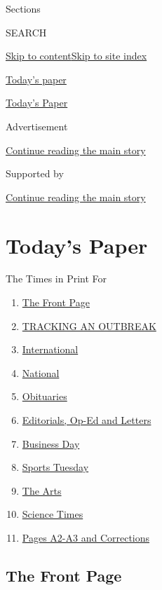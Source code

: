 Sections

SEARCH

\protect\hyperlink{site-content}{Skip to
content}\protect\hyperlink{site-index}{Skip to site index}

\href{https://www.nytimes.com/section/todayspaper}{Today's paper}

\href{https://myaccount.nytimes.com/auth/login?response_type=cookie\&client_id=vi}{}

\href{https://www.nytimes.com/section/todayspaper}{Today's Paper}

Advertisement

\protect\hyperlink{after-top}{Continue reading the main story}

Supported by

\protect\hyperlink{after-sponsor}{Continue reading the main story}

\hypertarget{todays-paper}{%
\section{Today's Paper}\label{todays-paper}}

The Times in Print For

\begin{enumerate}
\def\labelenumi{\arabic{enumi}.}
\tightlist
\item
  \protect\hyperlink{thefrontpage}{The Front Page}
\item
  \protect\hyperlink{trackinganoutbreak}{TRACKING AN OUTBREAK}
\item
  \protect\hyperlink{international}{International}
\item
  \protect\hyperlink{national}{National}
\item
  \protect\hyperlink{obituaries}{Obituaries}
\item
  \protect\hyperlink{editorialsux2cop-edandletters}{Editorials, Op-Ed
  and Letters}
\item
  \protect\hyperlink{businessday}{Business Day}
\item
  \protect\hyperlink{sportstuesday}{Sports Tuesday}
\item
  \protect\hyperlink{thearts}{The Arts}
\item
  \protect\hyperlink{sciencetimes}{Science Times}
\item
  \protect\hyperlink{pagesa2-a3andcorrections}{Pages A2-A3 and
  Corrections}
\end{enumerate}

\hypertarget{the-front-page}{%
\subsection{The Front Page}\label{the-front-page}}


